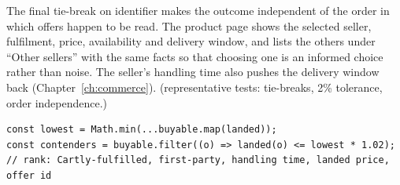 The final tie-break on identifier makes the outcome independent of the order in which offers happen to be read. The product page shows the selected seller, fulfilment, price, availability and delivery window, and lists the others under ``Other sellers'' with the same facts so that choosing one is an informed choice rather than noise. The seller's handling time also pushes the delivery window back (Chapter~\ref{ch:commerce}). \tagtest{} (representative tests: tie-breaks, 2\% tolerance, order independence.)

\begin{lstlisting}[caption={The contender rule, simplified from \code{catalog/offers.ts}.},label={lst:buybox}]
const lowest = Math.min(...buyable.map(landed));
const contenders = buyable.filter((o) => landed(o) <= lowest * 1.02);
// rank: Cartly-fulfilled, first-party, handling time, landed price, offer id
\end{lstlisting}
